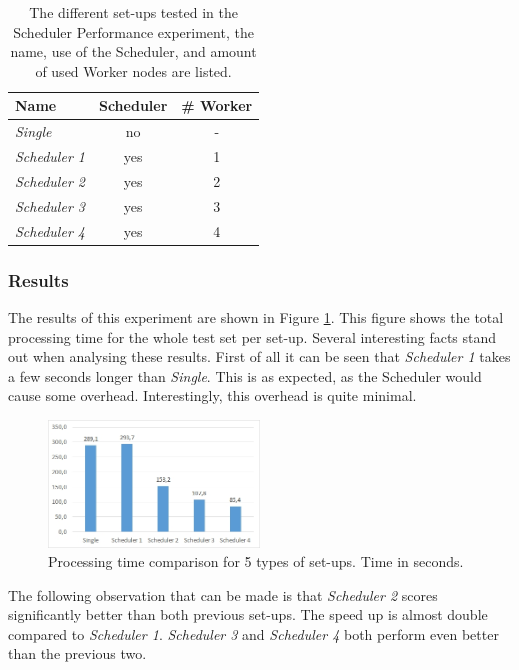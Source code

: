 \documentclass{acm_proc_article-sp}
\begin{document}
\begin{table}
	\centering
	\begin{tabular}{| l | c | c |}
		\hline
		Name & Scheduler & \# Worker \\ \hline \hline
		\emph{Single} & no & - \\ \hline
		\emph{Scheduler 1} & yes & 1 \\ \hline
		\emph{Scheduler 2} & yes & 2 \\ \hline
		\emph{Scheduler 3} & yes & 3 \\ \hline
		\emph{Scheduler 4} & yes & 4 \\ \hline
	\end{tabular}
	\caption{The different set-ups tested in the Scheduler Performance experiment, the name, use of the Scheduler, and amount of used Worker nodes are listed.}
	\label{tbl:setups}
\end{table}

\subsubsection{Results}
The results of this experiment are shown in Figure \ref{fig:diagram_total_processing}.
This figure shows the total processing time for the whole test set per set-up.
Several interesting facts stand out when analysing these results.
First of all it can be seen that \emph{Scheduler 1} takes a few seconds longer than \emph{Single}.
This is as expected, as the Scheduler would cause some overhead.
Interestingly, this overhead is quite minimal.

\begin{figure}
	\centering
	\includegraphics[width=0.5\textwidth]{images/diagram_total_processing.jpg}
	\caption{Processing time comparison for 5 types of set-ups. Time in seconds.}
	\label{fig:diagram_total_processing}
\end{figure}

The following observation that can be made is that \emph{Scheduler 2} scores significantly better than both previous set-ups.
The speed up is almost double compared to \emph{Scheduler 1}.
\emph{Scheduler 3} and \emph{Scheduler 4} both perform even better than the previous two.
\end{document}
